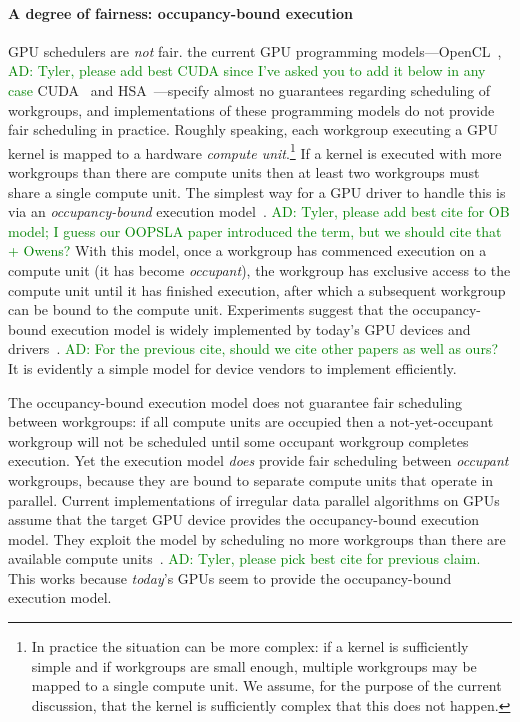 \documentclass[numbers,nocopyrightspace,10pt]{sigplanconf}
\newcommand{\ADComment}[1]{\textcolor{green}{AD: #1}}
\begin{document}
\paragraph{A degree of fairness: occupancy-bound execution}
GPU schedulers are \emph{not} fair. the current GPU
programming models---OpenCL~\cite{opencl2Spec}, \ADComment{Tyler, please add best CUDA since I've asked you to add it below in any case} CUDA~\cite{...}  and
HSA~\cite{HSAprogramming11}---specify almost no guarantees regarding scheduling of
workgroups, and implementations of these programming models do not
provide fair scheduling in practice.  Roughly speaking, each workgroup
executing a GPU kernel is mapped to a hardware \emph{compute
  unit}.\footnote{In practice the situation can be more complex: if a
  kernel is sufficiently simple and if workgroups are small enough,
  multiple workgroups may be mapped to a single compute unit.  We assume, for the purpose of the current discussion, that the kernel is sufficiently complex that this does not happen.}
%
If a kernel is executed with more workgroups than there are compute
units then at least two workgroups must share a single compute unit.
The simplest way for a GPU driver to handle this is via an \emph{occupancy-bound}
execution model~\cite{DBLP:conf/oopsla/SorensenDBGR16}. \ADComment{Tyler, please add best cite for OB model; I guess our OOPSLA paper introduced the term, but we should cite that + Owens?}  With this model, once a workgroup has commenced execution on a
compute unit (it has become \emph{occupant}), the workgroup has
exclusive access to the compute unit until it has finished execution,
after which a subsequent workgroup can be bound to the compute unit.
Experiments suggest that the occupancy-bound execution model is widely
implemented by today's GPU devices and drivers~\cite{DBLP:conf/oopsla/SorensenDBGR16}. \ADComment{For the previous cite, should we cite other papers as well as ours?}  It is
evidently a simple model for device vendors to implement efficiently.

The occupancy-bound execution model does not guarantee fair scheduling
between workgroups: if all compute units are occupied then a
not-yet-occupant workgroup will not be scheduled until some occupant
workgroup completes execution.  Yet the execution model \emph{does}
provide fair scheduling between \emph{occupant} workgroups, because
they are bound to separate compute units that operate in parallel.
Current implementations of irregular data parallel algorithms on GPUs
assume that the target GPU device provides the occupancy-bound
execution model.  They exploit the model by scheduling no more workgroups
than there are available compute units~\cite{...}. \ADComment{Tyler, please pick best cite for previous claim.} This works
because \emph{today}'s GPUs seem to provide the occupancy-bound
execution model.
\end{document}
